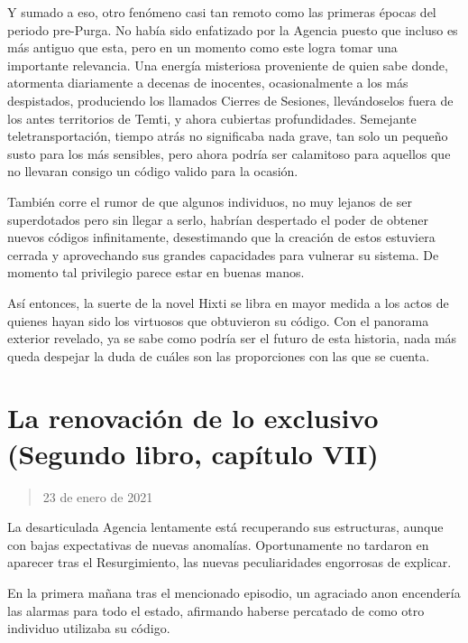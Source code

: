 \documentclass[
]{book}
\begin{document}
Y sumado a eso, otro fenómeno casi tan remoto como las primeras épocas del periodo pre-Purga. No había sido enfatizado por la Agencia puesto que incluso es más antiguo que esta, pero en un momento como este logra tomar una importante relevancia. Una energía misteriosa proveniente de quien sabe donde, atormenta diariamente a decenas de inocentes, ocasionalmente a los más despistados, produciendo los llamados Cierres de Sesiones, llevándoselos fuera de los antes territorios de Temti, y ahora cubiertas profundidades. Semejante teletransportación, tiempo atrás no significaba nada grave, tan solo un pequeño susto para los más sensibles, pero ahora podría ser calamitoso para aquellos que no llevaran consigo un código valido para la ocasión.

También corre el rumor de que algunos individuos, no muy lejanos de ser superdotados pero sin llegar a serlo, habrían despertado el poder de obtener nuevos códigos infinitamente, desestimando que la creación de estos estuviera cerrada y aprovechando sus grandes capacidades para vulnerar su sistema. De momento tal privilegio parece estar en buenas manos.

Así entonces, la suerte de la novel Hixti se libra en mayor medida a los actos de quienes hayan sido los virtuosos que obtuvieron su código. Con el panorama exterior revelado, ya se sabe como podría ser el futuro de esta historia, nada más queda despejar la duda de cuáles son las proporciones con las que se cuenta.

\hypertarget{la-renovaciuxf3n-de-lo-exclusivo-segundo-libro-capuxedtulo-vii}{%
\section{La renovación de lo exclusivo (Segundo libro, capítulo VII)}\label{la-renovaciuxf3n-de-lo-exclusivo-segundo-libro-capuxedtulo-vii}}

\begin{quote}
23 de enero de 2021
\end{quote}

La desarticulada Agencia lentamente está recuperando sus estructuras, aunque con bajas expectativas de nuevas anomalías. Oportunamente no tardaron en aparecer tras el Resurgimiento, las nuevas peculiaridades engorrosas de explicar.

En la primera mañana tras el mencionado episodio, un agraciado anon encendería las alarmas para todo el estado, afirmando haberse percatado de como otro individuo utilizaba su código.
\end{document}
